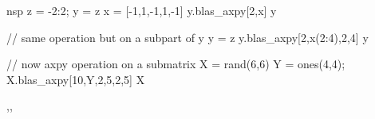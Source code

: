 \begin{examples}
\begin{mintednsp}{nsp}
z = -2:2;
y = z
x = [-1,1,-1,1,-1]
y.blas_axpy[2,x]
y 

// same operation but on a subpart of y
y = z
y.blas_axpy[2,x(2:4),2,4]
y

// now axpy operation on a submatrix
X = rand(6,6)
Y = ones(4,4);
X.blas_axpy[10,Y,2,5,2,5]
X
\end{mintednsp}

\end{examples}

\begin{manseealso}
 ,,
\end{manseealso}

